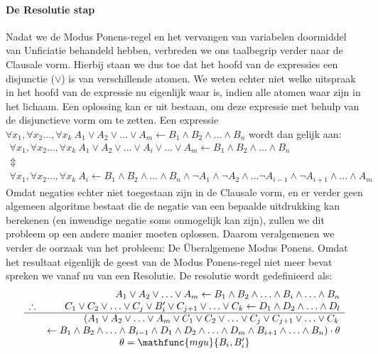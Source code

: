 \paragraph{De Resolutie stap}Nadat we de Modus Ponens-regel en het vervangen van variabelen doormiddel van Unficiatie behandeld hebben, verbreden we ons taalbegrip verder naar de Clausale vorm. Hierbij staan we dus toe dat het hoofd van de expressies een disjunctie ($\vee$) is van verschillende atomen. We weten echter niet welke uitspraak in het hoofd van de expressie nu eigenlijk waar is, indien alle atomen waar zijn in het lichaam. Een oplossing kan er uit bestaan, om deze expressie met behulp van de disjunctieve vorm om te zetten. Een expressie $\forall x_1,\forall x_2\ldots,\forall x_k\ A_1\vee A_2\vee\ldots\vee A_m\leftarrow B_1\wedge B_2\wedge\ldots\wedge B_n$ wordt dan gelijk aan:
\begin{equation}
\begin{array}{c}
\forall x_1,\forall x_2\ldots,\forall x_k\ A_1\vee A_2\vee\ldots\vee A_i\vee\ldots\vee A_m\leftarrow B_1\wedge B_2\wedge\ldots\wedge B_n\\
\Updownarrow\\
\forall x_1,\forall x_2\ldots,\forall x_k\ A_i\leftarrow B_1\wedge B_2\wedge\ldots\wedge B_n\wedge\neg A_1\wedge\neg A_2\wedge\ldots\neg A_{i-1}\wedge\neg A_{i+1}\wedge\ldots\wedge A_m
\end{array}
\end{equation}
Omdat negaties echter niet toegestaan zijn in de Clausale vorm, en er verder geen algemeen algoritme bestaat die de negatie van een bepaalde uitdrukking kan berekenen (en inwendige negatie soms onmogelijk kan zijn), zullen we dit probleem op een andere manier moeten oplossen. Daarom veralgemenen we verder de oorzaak van het probleem: De Überalgemene Modus Ponens. Omdat het resultaat eigenlijk de geest van de Modus Ponens-regel niet meer bevat spreken we vanaf nu van een Resolutie. De resolutie wordt gedefinieerd als:
\begin{equation}
\begin{array}{lr}
&A_1\vee A_2\vee\ldots\vee A_m\leftarrow B_1\wedge B_2\wedge\ldots\wedge B_i\wedge\ldots\wedge B_n\\
\therefore&C_1\vee C_2\vee\ldots\vee C_j\vee B_i'\vee C_{j+1}\vee\ldots\vee C_k\leftarrow D_1\wedge D_2\wedge\ldots\wedge D_l\\
\hline
&\left(A_1\vee A_2\vee\ldots\vee A_m\vee C_1\vee C_2\vee\ldots\vee C_j\vee C_{j+1}\vee\ldots\vee C_k\right.\\
&\left.\leftarrow B_1\wedge B_2\wedge\ldots\wedge B_{i-1}\wedge D_1\wedge D_2\wedge\ldots\wedge D_m\wedge B_{i+1}\wedge\ldots\wedge B_n\right)\cdot\theta\\
\multicolumn{2}{c}{\theta=\mathfunc{mgu}{B_i,B_i'}}
\end{array}
\end{equation}
